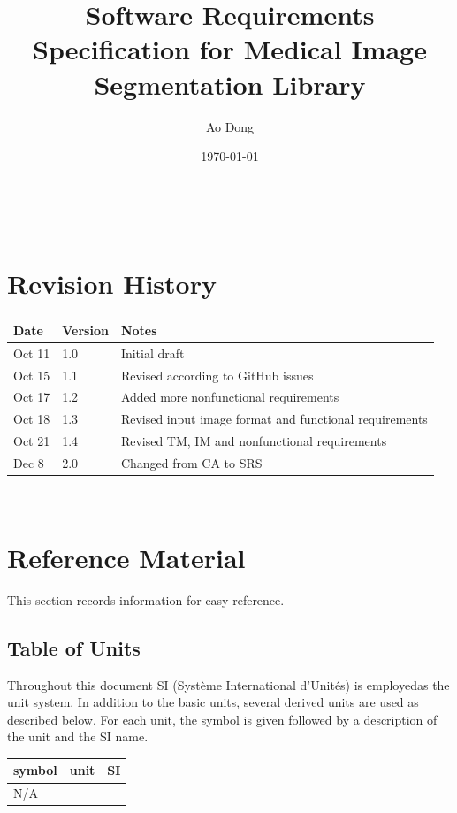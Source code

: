 \documentclass[12pt]{article}
\begin{document}
\title{Software Requirements Specification for Medical Image Segmentation
Library}
\author{Ao Dong}
\date{\today}

\maketitle

~\newpage


\section{Revision History}

\begin{tabularx}{\textwidth}{p{3cm}p{2cm}X}
\toprule {\bf Date} & {\bf Version} & {\bf Notes}\\
\midrule
Oct 11 & 1.0 & Initial draft\\
Oct 15 & 1.1 & Revised according to GitHub issues\\
Oct 17 & 1.2 & Added more nonfunctional requirements\\
Oct 18 & 1.3 & Revised input image format and functional requirements\\
Oct 21 & 1.4 & Revised TM, IM and nonfunctional requirements\\
Dec 8 & 2.0 & Changed from CA to SRS\\
\bottomrule
\end{tabularx}

~\newpage
	
\section{Reference Material}

This section records information for easy reference.

\subsection{Table of Units}

Throughout this document SI (Syst\`{e}me International d'Unit\'{e}s) is
employedas the unit system. In addition to the basic units, several derived
units are
used as described below.  For each unit, the symbol is given followed by a
description of the unit and the SI name.
~\newline

\renewcommand{\arraystretch}{1.2}
  \noindent \begin{tabular}{l l l} 
    \toprule		
    \textbf{symbol} & \textbf{unit} & \textbf{SI}\\
    \midrule 
    N/A\\
    \bottomrule
  \end{tabular}
\end{document}

